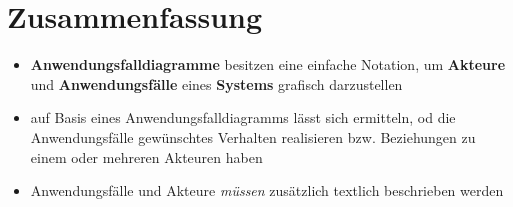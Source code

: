 \section{Zusammenfassung}



\begin{itemize}
    \item \textbf{Anwendungsfalldiagramme} besitzen eine einfache Notation, um \textbf{Akteure} und \textbf{Anwendungsfälle} eines \textbf{Systems} grafisch darzustellen
    \item auf Basis eines Anwendungsfalldiagramms lässt sich ermitteln, od die Anwendungsfälle gewünschtes Verhalten realisieren bzw. Beziehungen zu einem oder mehreren Akteuren haben
    \item Anwendungsfälle und Akteure \textit{müssen} zusätzlich textlich beschrieben werden
\end{itemize}